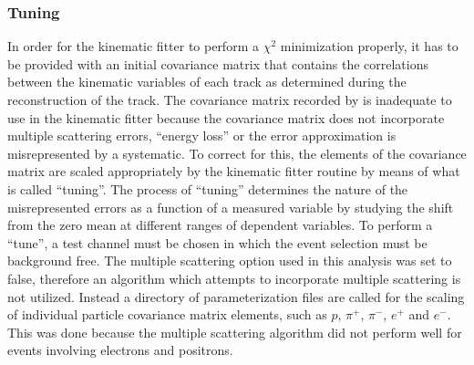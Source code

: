 \subsubsection{Tuning}\label{analysis.fitting.tune}
In order for the kinematic fitter to perform a $\chi^2$ minimization properly, it has to be provided with an initial covariance matrix that contains the correlations between the kinematic variables of each track as determined during the reconstruction of the track. The covariance matrix recorded by  is inadequate to use in the kinematic fitter because the covariance matrix does not incorporate multiple scattering errors, ``energy loss'' or the error approximation is misrepresented by a systematic. To correct for this, the elements of the covariance matrix are scaled appropriately by the kinematic fitter routine by means of what is called ``tuning''. The process of ``tuning'' determines the nature of the misrepresented errors as a function of a measured variable by studying the shift from the zero mean at different ranges of dependent variables. To perform a ``tune'', a test channel must be chosen in which the event selection must be background free. The multiple scattering option used in this analysis was set to false, therefore an algorithm which attempts to incorporate multiple scattering is not utilized. Instead a directory of parameterization files are called for the scaling of individual particle covariance matrix elements, such as $p$, $\pi^+$, $\pi^-$, $e^+$ and $e^-$. This was done because the multiple scattering algorithm did not perform well for events involving electrons and positrons. 

